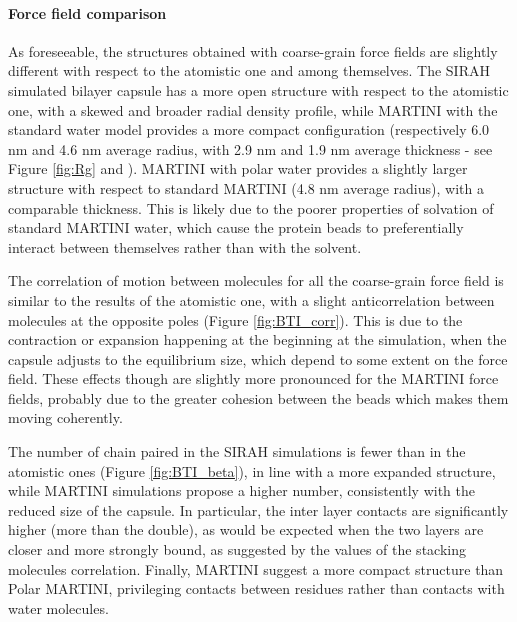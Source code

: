 \paragraph{Force field comparison}
As foreseeable, the structures obtained with coarse-grain force fields are slightly different with respect to the atomistic one and among themselves.
%
The SIRAH simulated bilayer capsule has a more open structure with respect to the atomistic one, with a skewed and broader radial density profile, while MARTINI with the standard water model provides a more compact configuration (respectively 6.0 nm and 4.6 nm average radius, with 2.9 nm and 1.9 nm average thickness - see Figure \ref{fig:Rg} and ). MARTINI with polar water provides a slightly larger structure with respect to standard MARTINI (4.8 nm average radius), with a comparable thickness. This is likely due to the poorer properties of solvation of standard MARTINI water, which cause the protein beads to preferentially interact between themselves rather than with the solvent. 

The correlation of motion between molecules for all the coarse-grain force field is similar to the results of the atomistic one, with a slight anticorrelation between molecules at the opposite poles (Figure \ref{fig:BTI_corr}). This is due to the contraction or expansion happening at the beginning at the simulation, when the capsule adjusts to the equilibrium size, which depend to some extent on the force field.
%
These effects though are slightly more pronounced for the MARTINI force fields, probably due to the greater cohesion between the beads which makes them moving coherently.

The number of chain paired in the SIRAH simulations is fewer than in the atomistic ones (Figure \ref{fig:BTI_beta}), in line with a more expanded structure, while MARTINI simulations propose a higher number, consistently with the reduced size of the capsule. In particular, the inter layer contacts are significantly higher (more than the double), as would be expected when the two layers are closer and more strongly bound, as suggested by the values of the stacking molecules correlation. Finally, MARTINI suggest a more compact structure than Polar MARTINI, privileging contacts between residues rather than contacts with water molecules.

